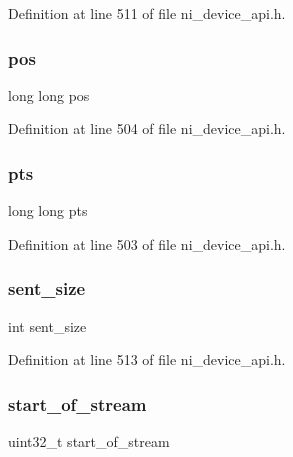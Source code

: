 Definition at line 511 of file ni\+\_\+device\+\_\+api.\+h.

\mbox{\label{struct__ni__packet_ad699b0e99e873ba04ecb17f6fa8747e3}} 
\subsubsection{\texorpdfstring{pos}{pos}}
{\footnotesize\ttfamily long long pos}



Definition at line 504 of file ni\+\_\+device\+\_\+api.\+h.

\mbox{\label{struct__ni__packet_aa549d909938aa26820c29b020cd43ad6}} 
\subsubsection{\texorpdfstring{pts}{pts}}
{\footnotesize\ttfamily long long pts}



Definition at line 503 of file ni\+\_\+device\+\_\+api.\+h.

\mbox{\label{struct__ni__packet_ab9bf0c4ff7f421a313d647422715028d}} 
\subsubsection{\texorpdfstring{sent\_size}{sent\_size}}
{\footnotesize\ttfamily int sent\+\_\+size}



Definition at line 513 of file ni\+\_\+device\+\_\+api.\+h.

\mbox{\label{struct__ni__packet_a3136d4ad964deb437b6aaadcb031d90f}} 
\subsubsection{\texorpdfstring{start\_of\_stream}{start\_of\_stream}}
{\footnotesize\ttfamily uint32\+\_\+t start\+\_\+of\+\_\+stream}




